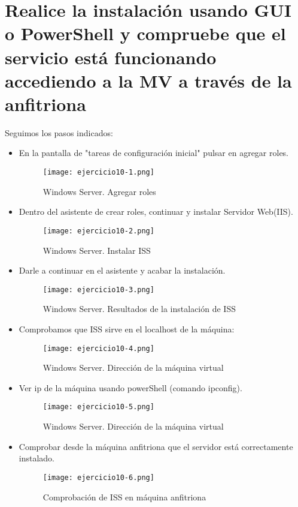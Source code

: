 	\section{Realice la instalación usando GUI o PowerShell y compruebe que el servicio está funcionando accediendo a la MV a través de la anfitriona}
	
	Seguimos los pasos indicados:
	
	\begin{itemize}
		\item En la pantalla de "tareas de configuración inicial" pulsar en agregar roles.
			\begin{figure}[H]	
				\centering
				\texttt{[image: ejercicio10-1.png]} 
				\label{figura77} 
				\caption{Windows Server. Agregar roles}
			\end{figure}
		\item Dentro del asistente de crear roles, continuar y instalar Servidor Web(IIS).
			\begin{figure}[H]	
				\centering
				\texttt{[image: ejercicio10-2.png]} 
				\label{figura78} 
				\caption{Windows Server. Instalar ISS}
			\end{figure}
		\item Darle a continuar en el asistente y acabar la instalación.
			\begin{figure}[H]	
				\centering
				\texttt{[image: ejercicio10-3.png]} 
				\label{figura79} 
				\caption{Windows Server. Resultados de la instalación de ISS}
			\end{figure}
		\item Comprobamos que ISS sirve en el localhost de la máquina:
			\begin{figure}[H]	
				\centering
				\texttt{[image: ejercicio10-4.png]} 
				\label{figura80} 
				\caption{Windows Server. Dirección de la máquina virtual}
			\end{figure}
		\item Ver ip de la máquina usando powerShell (comando ipconfig\cite{ejercicio10-1}).
			\begin{figure}[H]	
				\centering
				\texttt{[image: ejercicio10-5.png]} 
				\label{figura81} 
				\caption{Windows Server. Dirección de la máquina virtual}
			\end{figure}
		\item Comprobar desde la máquina anfitriona que el servidor está correctamente instalado.
			\begin{figure}[H]	
				\centering
				\texttt{[image: ejercicio10-6.png]} 
				\label{figura82} 
				\caption{Comprobación de ISS en máquina anfitriona}
			\end{figure}
	\end{itemize}
	
